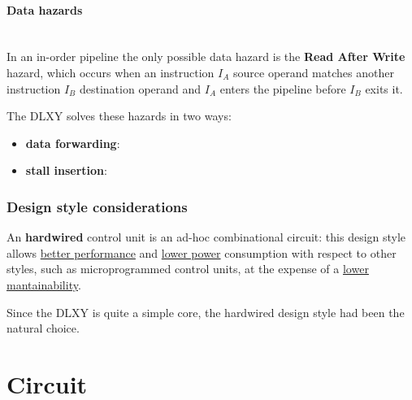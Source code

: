 \paragraph{Data hazards} \mbox{} \\
In an in-order pipeline the only possible data hazard is the \textbf{Read After
Write} hazard, which occurs when an instruction $I_A$ source operand matches
another instruction $I_B$ destination operand and $I_A$ enters the pipeline
before $I_B$ exits it.

\bigskip
The DLXY solves these hazards in two ways:
\begin{itemize}
	\item \textbf{data forwarding}:
	\item \textbf{stall insertion}:
\end{itemize}

\subsubsection{Design style considerations}
An \textbf{hardwired} control unit is an ad-hoc combinational circuit:
this design style allows \underline{better performance} and \underline{lower power}
consumption with respect to other styles, such as microprogrammed control units,
at the expense of a \underline{lower mantainability}.

\bigskip
Since the DLXY is quite a simple core, the hardwired design style had been the
natural choice.

\section{Circuit}


